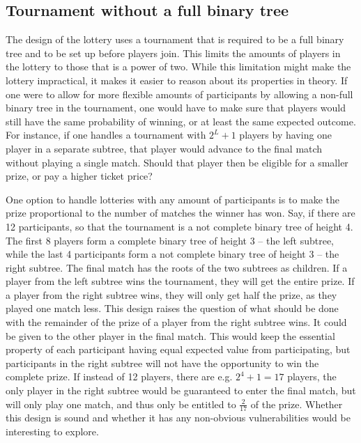 \subsection{Tournament without a full binary tree}

The design of the lottery uses a tournament that is required to be a full binary tree and to be set up before players join. This limits the amounts of players in the lottery to those that is a power of two. While this limitation might make the lottery impractical, it makes it easier to reason about its properties in theory. If one were to allow for more flexible amounts of participants by allowing a non-full binary tree in the tournament, one would have to make sure that players would still have the same probability of winning, or at least the same expected outcome. For instance, if one handles a tournament with $2^L+1$ players by having one player in a separate subtree, that player would advance to the final match without playing a single match. Should that player then be eligible for a smaller prize, or pay a higher ticket price?

One option to handle lotteries with any amount of participants is to make the prize proportional to the number of matches the winner has won. Say, if there are 12 participants, so that the tournament is a not complete binary tree of height 4. The first 8 players form a complete binary tree of height 3 – the left subtree, while the last 4 participants form a not complete binary tree of height 3 – the right subtree. The final match has the roots of the two subtrees as children. If a player from the left subtree wins the tournament, they will get the entire prize. If a player from the right subtree wins, they will only get half the prize, as they played one match less. This design raises the question of what should be done with the remainder of the prize of a player from the right subtree wins. It could be given to the other player in the final match. This would keep the essential property of each participant having equal expected value from participating, but participants in the right subtree will not have the opportunity to win the complete prize. If instead of 12 players, there are e.g. $2^4+1=17$ players, the only player in the right subtree would be guaranteed to enter the final match, but will only play one match, and thus only be entitled to $\frac{2}{17}$ of the prize. 
Whether this design is sound and whether it has any non-obvious vulnerabilities would be interesting to explore.

